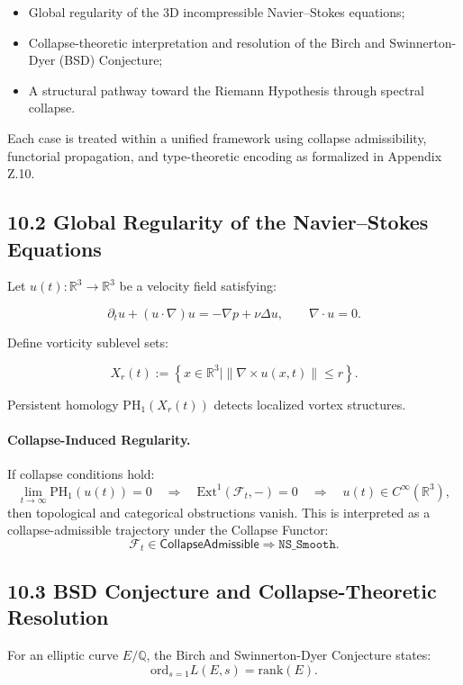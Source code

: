 \documentclass[11pt]{article}
\begin{document}
\begin{itemize}
    \item Global regularity of the 3D incompressible Navier–Stokes equations;
    \item Collapse-theoretic interpretation and resolution of the Birch and Swinnerton-Dyer (BSD) Conjecture;
    \item A structural pathway toward the Riemann Hypothesis through spectral collapse.
\end{itemize}

Each case is treated within a unified framework using collapse admissibility, functorial propagation, and type-theoretic encoding as formalized in Appendix Z.10.

\subsection*{10.2 Global Regularity of the Navier–Stokes Equations}

Let \( u(t) : \mathbb{R}^3 \to \mathbb{R}^3 \) be a velocity field satisfying:

\[
\partial_t u + (u \cdot \nabla)u = -\nabla p + \nu \Delta u, \qquad \nabla \cdot u = 0.
\]

Define vorticity sublevel sets:

\[
X_r(t) := \left\{ x \in \mathbb{R}^3 \mid \| \nabla \times u(x,t) \| \leq r \right\}.
\]

Persistent homology \( \mathrm{PH}_1(X_r(t)) \) detects localized vortex structures.

\paragraph{Collapse-Induced Regularity.}
If collapse conditions hold:
\[
\lim_{t \to \infty} \mathrm{PH}_1(u(t)) = 0 \quad \Rightarrow \quad \mathrm{Ext}^1(\mathcal{F}_t, -) = 0 \quad \Rightarrow \quad u(t) \in C^\infty(\mathbb{R}^3),
\]
then topological and categorical obstructions vanish. This is interpreted as a collapse-admissible trajectory under the Collapse Functor:
\[
\mathcal{F}_t \in \mathsf{CollapseAdmissible} \Rightarrow \texttt{NS\_Smooth}.
\]

\subsection*{10.3 BSD Conjecture and Collapse-Theoretic Resolution}

For an elliptic curve \( E/\mathbb{Q} \), the Birch and Swinnerton-Dyer Conjecture states:
\[
\mathrm{ord}_{s=1} L(E, s) = \mathrm{rank}(E).
\]
\end{document}
